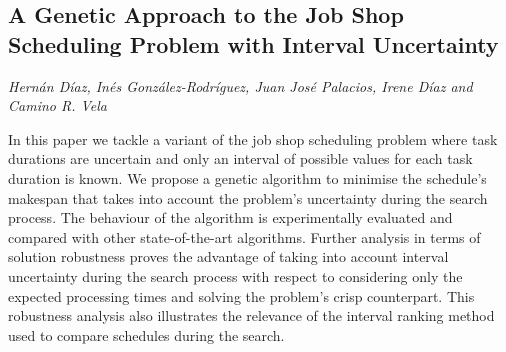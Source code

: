 \documentclass[../booklet.tex]{subfiles}
\begin{document}
\subsection[A Genetic Approach to the Job Shop Scheduling Problem with Interval Uncertainty. {\it Hernán Díaz, Inés González-Rodríguez, Juan José Palacios, Irene Díaz and Camino R. Vela}]{A Genetic Approach to the Job Shop Scheduling Problem with Interval Uncertainty}
    

\begin{center}
  {\it Hernán Díaz, Inés González-Rodríguez, Juan José Palacios, Irene Díaz and Camino R. Vela}
\end{center}

\vskip 0.8cm


In this paper we tackle a variant of the job shop scheduling problem where task durations are uncertain and only an interval of possible values for each task duration is known. We propose a genetic algorithm to minimise the schedule's makespan that takes into account the problem's uncertainty during the search process. The behaviour of the algorithm is experimentally evaluated  and compared with other state-of-the-art algorithms. Further analysis in terms of solution robustness proves the advantage of taking into account interval uncertainty during the search process with respect to considering only the expected processing times and solving the problem's crisp counterpart. This robustness analysis also illustrates the relevance of the interval ranking method used to compare schedules during the search.
\end{document}
